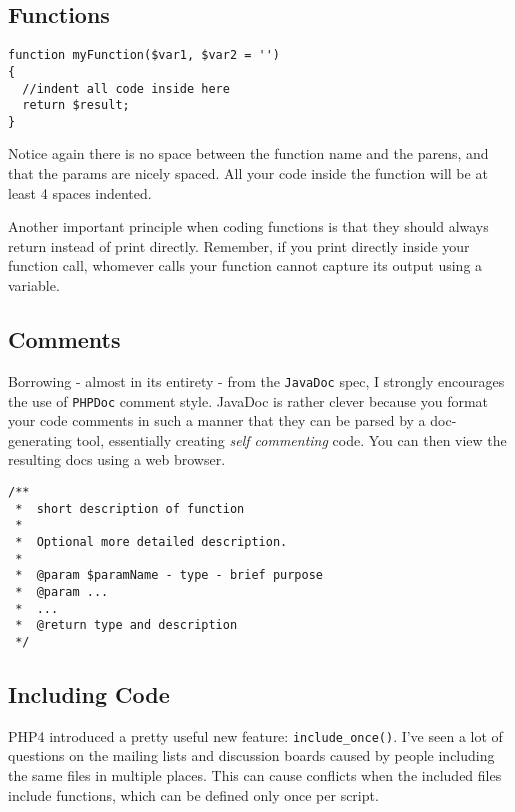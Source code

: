     \subsection{Functions}

\begin{lstlisting}[stepnumber=0,frame={}]
function myFunction($var1, $var2 = '')
{
  //indent all code inside here
  return $result;
}
\end{lstlisting}

        Notice again there is no space between the function name and the parens, and that the params are nicely
        spaced. All your code inside the function will be at least 4 spaces indented.

        Another important principle when coding functions is that they should always return instead of print directly.
        Remember, if you print directly inside your function call, whomever calls your function cannot capture its
        output using a variable.

    \subsection{Comments}
        Borrowing - almost in its entirety - from the \texttt{JavaDoc} spec, I strongly encourages the use of \texttt{PHPDoc} comment style.
        JavaDoc is rather clever because you format your code comments in such a manner that they can be parsed by a
        doc-generating tool, essentially creating \emph{self commenting} code. You can then view the resulting docs using a web browser.

\begin{lstlisting}[stepnumber=0,frame={}]
/**
 *  short description of function
 *
 *  Optional more detailed description.
 *
 *  @param $paramName - type - brief purpose
 *  @param ...
 *  ...
 *  @return type and description
 */
\end{lstlisting}


    \subsection{Including Code}
        PHP4 introduced a pretty useful new feature: \texttt{include\_once()}. I've seen a lot of questions on the mailing
        lists and discussion boards caused by people including the same files in multiple places. This can cause conflicts
        when the included files include functions, which can be defined only once per script.

